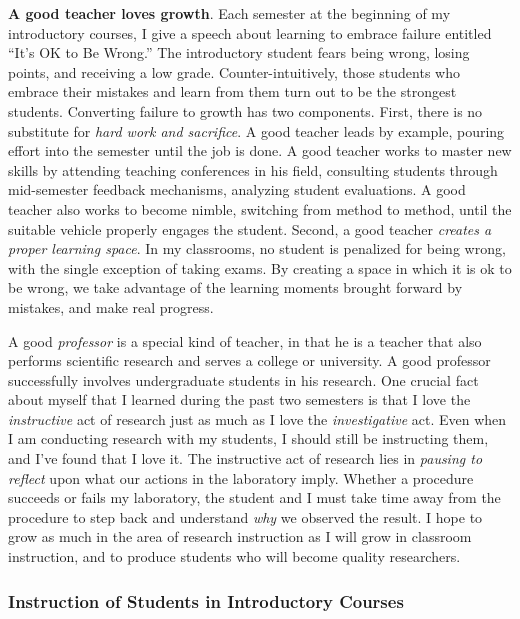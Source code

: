 \documentclass[../../main.tex]{subfiles}
\begin{document}
\textbf{A good teacher loves growth}.  Each semester at the beginning of my introductory courses, I give a speech about learning to embrace failure entitled ``It's OK to Be Wrong.''  The introductory student fears being wrong, losing points, and receiving a low grade.  Counter-intuitively, those students who embrace their mistakes and learn from them turn out to be the strongest students.  Converting failure to growth has two components.  First, there is no substitute for \textit{hard work and sacrifice}.  A good teacher leads by example, pouring effort into the semester until the job is done.  A good teacher works to master new skills by attending teaching conferences in his field, consulting students through mid-semester feedback mechanisms, analyzing student evaluations.  A good teacher also works to become nimble, switching from method to method, until the suitable vehicle properly engages the student.  Second, a good teacher \textit{creates a proper learning space}.  In my classrooms, no student is penalized for being wrong, with the single exception of taking exams.  By creating a space in which it is ok to be wrong, we take advantage of the learning moments brought forward by mistakes, and make real progress. \\ \hspace{0.1cm}

A good \textit{professor} is a special kind of teacher, in that he is a teacher that also performs scientific research and serves a college or university.  A good professor successfully involves undergraduate students in his research.  One crucial fact about myself that I learned during the past two semesters is that I love the \textit{instructive} act of research just as much as I love the \textit{investigative} act.  Even when I am conducting research with my students, I should still be instructing them, and I've found that I love it.  The instructive act of research lies in \textit{pausing to reflect} upon what our actions in the laboratory imply.  Whether a procedure succeeds or fails my laboratory, the student and I must take time away from the procedure to step back and understand \textit{why} we observed the result.  I hope to grow as much in the area of research instruction as I will grow in classroom instruction, and to produce students who will become quality researchers.

\subsubsection{Instruction of Students in Introductory Courses}
\end{document}

